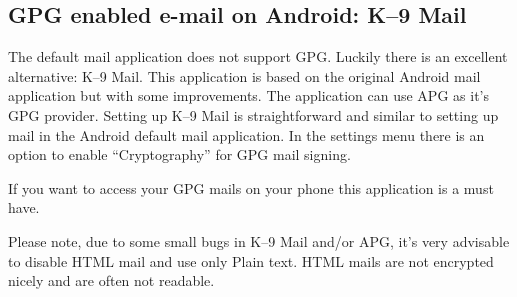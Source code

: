 \subsection{GPG enabled e-mail on Android: K--9 Mail}

The default mail application does not support GPG. Luckily there is an
excellent alternative: K--9 Mail. This application is based on the
original Android mail application but with some improvements. The
application can use APG as it's GPG provider. Setting up K--9 Mail is
straightforward and similar to setting up mail in the Android default
mail application. In the settings menu there is an option to enable
``Cryptography'' for GPG mail signing.

If you want to access your GPG mails on your phone this application is a
must have.

Please note, due to some small bugs in K--9 Mail and/or APG, it's very
advisable to disable HTML mail and use only Plain text. HTML mails are
not encrypted nicely and are often not readable.

